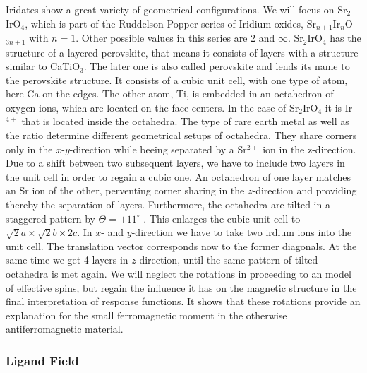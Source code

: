 \documentclass[a4paper,12pt]{report}
\begin{document}
Iridates show a great variety of geometrical configurations. 
We will focus on Sr$_2$IrO$_4$, which is part of the Ruddelson-Popper series of Iridium oxides, Sr$_{n+1}$Ir$_{n}$O$_{3n+1}$ with $n =1$. 
Other possible values in this series are 2 and $\infty$.
Sr$_2$IrO$_4$ has the structure of a layered perovskite, that means it consists of layers with a structure similar to CaTiO$_3$.
The later one is also called perovskite and lends its name to the perovskite structure.
It consists of a cubic unit cell, with one type of atom, here Ca on the edges. 
The other atom, Ti, is embedded in an octahedron of 
oxygen ions, which are located on the face centers.
%
%
In the case of Sr$_2$IrO$_4$ it is Ir$^{4+}$ that is located  inside the octahedra. 
The type of rare earth metal as well as the ratio determine different geometrical setups of octahedra. 
They share corners only in the $x$-$y$-direction while beeing separated by a Sr$^{2+}$ ion in the z-direction.
Due to a shift between two subsequent layers, we have to include two layers in the unit cell in order to regain a cubic one.
An octahedron of one layer matches an Sr ion of the other, perventing  corner sharing in the $z$-direction and providing thereby the separation of layers. 
% 
Furthermore, the octahedra are tilted in a staggered pattern by $\Theta = \pm 11^{\circ}$ \cite{PhysRevB.49.9198}.
This enlarges the cubic unit cell to $\sqrt2 a\times\sqrt 2b \times 2c$.
In $x$- and $y$-direction we have to take two irdium ions into the unit cell. The translation vector corresponds now to the former diagonals.
At the same time we get 4 layers in $z$-direction, until the same pattern of tilted octahedra is met again. 
%
We will neglect the rotations in proceeding to an model of effective spins, but regain the influence it has on the magnetic structure in the final interpretation of 
response functions. It shows that these rotations provide an explanation for the small ferromagnetic moment in the otherwise antiferromagnetic material. 

\subsubsection{Ligand Field}
\end{document}
